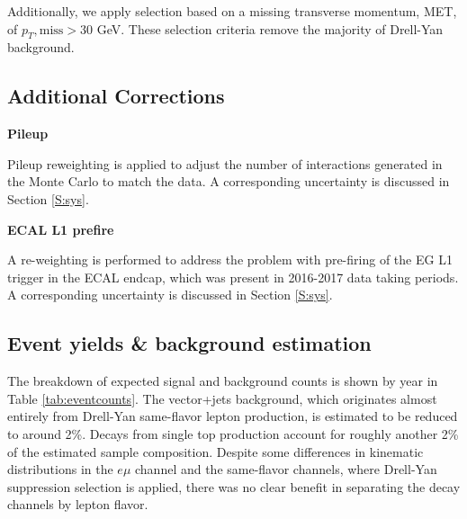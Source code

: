 Additionally, we apply selection based on a missing transverse momentum, MET, of $p_{T}\mathrm{,miss}>30$ \unit{GeV}. These selection criteria remove the majority of Drell-Yan background. 

\subsection{Additional Corrections}
\par \noindent
\textbf{Pileup }

Pileup reweighting is applied to adjust the number of interactions generated in the Monte Carlo to match the data. A corresponding uncertainty is discussed in Section \ref{S:sys}.

\par \noindent
\textbf{ECAL L1 prefire }

A re-weighting is performed to address the problem with pre-firing of the EG L1 trigger in the ECAL endcap, which was present in 2016-2017 data taking periods. A corresponding uncertainty is discussed in Section \ref{S:sys}.

\subsection{Event yields \& background estimation}
\label{SS:bg}

The breakdown of expected signal and background counts is shown by year in Table \ref{tab:eventcounts}. The vector+jets background, which originates almost entirely from Drell-Yan same-flavor lepton production, is estimated to be reduced to around 2\%. Decays from single top production account for roughly another 2\% of the estimated sample composition. Despite some differences in kinematic distributions in the $e\mu$ channel and the same-flavor channels, where Drell-Yan suppression selection is applied, there was no clear benefit in separating the decay channels by lepton flavor.


